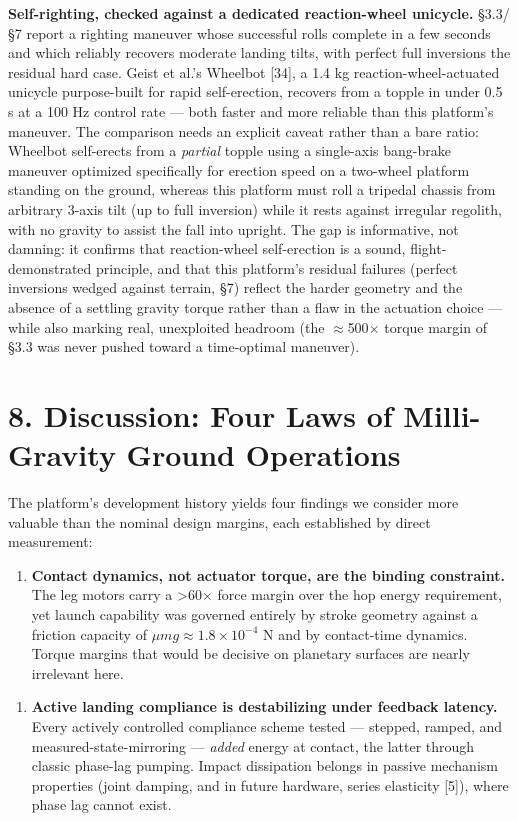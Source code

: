 \documentclass[conference]{IEEEtran}
\begin{document}
\textbf{Self-righting, checked against a dedicated reaction-wheel unicycle.} \S3.3/\S7 report a righting maneuver whose successful rolls complete in a few seconds and which reliably recovers moderate landing tilts, with perfect full inversions the residual hard case. Geist et al.'s Wheelbot [34], a 1.4 kg reaction-wheel-actuated unicycle purpose-built for rapid self-erection, recovers from a topple in under 0.5 s at a 100 Hz control rate --- both faster and more reliable than this platform's maneuver. The comparison needs an explicit caveat rather than a bare ratio: Wheelbot self-erects from a \emph{partial} topple using a single-axis bang-brake maneuver optimized specifically for erection speed on a two-wheel platform standing on the ground, whereas this platform must roll a tripedal chassis from arbitrary 3-axis tilt (up to full inversion) while it rests against irregular regolith, with no gravity to assist the fall into upright. The gap is informative, not damning: it confirms that reaction-wheel self-erection is a sound, flight-demonstrated principle, and that this platform's residual failures (perfect inversions wedged against terrain, \S7) reflect the harder geometry and the absence of a settling gravity torque rather than a flaw in the actuation choice --- while also marking real, unexploited headroom (the $\approx$500$\times$ torque margin of \S3.3 was never pushed toward a time-optimal maneuver).

\section*{8. Discussion: Four Laws of Milli-Gravity Ground Operations}

The platform's development history yields four findings we consider more valuable than the nominal design margins, each established by direct measurement:

\begin{enumerate}
\item \textbf{Contact dynamics, not actuator torque, are the binding constraint.} The leg motors carry a >60\ensuremath{\times} force margin over the hop energy requirement, yet launch capability was governed entirely by stroke geometry against a friction capacity of $\mu mg \approx 1.8\times10^{-4}$ N and by contact-time dynamics. Torque margins that would be decisive on planetary surfaces are nearly irrelevant here.
\end{enumerate}

\begin{enumerate}
\item \textbf{Active landing compliance is destabilizing under feedback latency.} Every actively controlled compliance scheme tested --- stepped, ramped, and measured-state-mirroring --- \emph{added} energy at contact, the latter through classic phase-lag pumping. Impact dissipation belongs in passive mechanism properties (joint damping, and in future hardware, series elasticity [5]), where phase lag cannot exist.
\end{enumerate}
\end{document}
